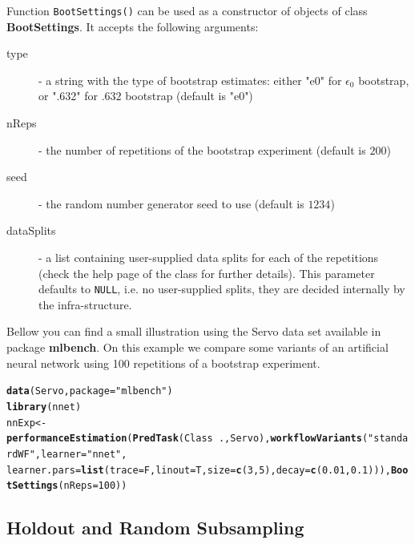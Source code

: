 \documentclass[10pt,a4paper]{article}\usepackage[]{graphicx}\usepackage[]{color}
\makeatletter
\newcommand{\hlnum}[1]{\textcolor[rgb]{0.686,0.059,0.569}{#1}}%
\newcommand{\hlstr}[1]{\textcolor[rgb]{0.192,0.494,0.8}{#1}}%
\newcommand{\hlopt}[1]{\textcolor[rgb]{0,0,0}{#1}}%
\newcommand{\hlstd}[1]{\textcolor[rgb]{0.345,0.345,0.345}{#1}}%
\newcommand{\hlkwb}[1]{\textcolor[rgb]{0.69,0.353,0.396}{#1}}%
\newcommand{\hlkwc}[1]{\textcolor[rgb]{0.333,0.667,0.333}{#1}}%
\newcommand{\hlkwd}[1]{\textcolor[rgb]{0.737,0.353,0.396}{\textbf{#1}}}%
\newenvironment{kframe}{%
 \def\at@end@of@kframe{}%
 \ifinner\ifhmode%
  \def\at@end@of@kframe{\end{minipage}}%
  \begin{minipage}{\columnwidth}%
 \fi\fi%
 \def\FrameCommand##1{\hskip\@totalleftmargin \hskip-\fboxsep
 \colorbox{shadecolor}{##1}\hskip-\fboxsep
     \hskip-\linewidth \hskip-\@totalleftmargin \hskip\columnwidth}%
 \MakeFramed {\advance\hsize-\width
   \@totalleftmargin\z@ \linewidth\hsize
   \@setminipage}}%
 {\par\unskip\endMakeFramed%
 \at@end@of@kframe}
\newenvironment{knitrout}{}{} %
\makeatother
\begin{document}
Function \texttt{BootSettings()} can be used as a constructor of
objects of class \textbf{BootSettings}. It accepts the following
arguments:

\begin{description}
\item[type] - a string with the type of bootstrap estimates: either "e0" for $\epsilon_0$ bootstrap, or ".632" for $.632$ bootstrap (default is "e0")
\item[nReps] - the number of repetitions of the bootstrap experiment (default is $200$)
\item[seed] - the random number generator seed to use (default is $1234$)
\item[dataSplits] - a list containing user-supplied data splits
  for each of the repetitions (check the help page of the
  class for further details). This parameter defaults to
  \texttt{NULL}, i.e. no user-supplied splits, they are decided
  internally by the infra-structure.
\end{description}

Bellow you can find a small illustration using the Servo data set available in package \textbf{mlbench}. On this example we compare some variants of an artificial neural network using 100 repetitions of a bootstrap experiment. 

\begin{knitrout}
\color{fgcolor}\begin{kframe}
\begin{alltt}
\hlkwd{data}\hlstd{(Servo,} \hlkwc{package} \hlstd{=} \hlstr{"mlbench"}\hlstd{)}
\hlkwd{library}\hlstd{(nnet)}
\hlstd{nnExp} \hlkwb{<-} \hlkwd{performanceEstimation}\hlstd{(}\hlkwd{PredTask}\hlstd{(Class} \hlopt{~} \hlstd{., Servo),} \hlkwd{workflowVariants}\hlstd{(}\hlstr{"standardWF"}\hlstd{,} \hlkwc{learner} \hlstd{=} \hlstr{"nnet"}\hlstd{,}
    \hlkwc{learner.pars} \hlstd{=} \hlkwd{list}\hlstd{(}\hlkwc{trace} \hlstd{= F,} \hlkwc{linout} \hlstd{= T,} \hlkwc{size} \hlstd{=} \hlkwd{c}\hlstd{(}\hlnum{3}\hlstd{,} \hlnum{5}\hlstd{),} \hlkwc{decay} \hlstd{=} \hlkwd{c}\hlstd{(}\hlnum{0.01}\hlstd{,} \hlnum{0.1}\hlstd{))),} \hlkwd{BootSettings}\hlstd{(}\hlkwc{nReps} \hlstd{=} \hlnum{100}\hlstd{))}
\end{alltt}
\end{kframe}
\end{knitrout}


\subsection{Holdout and Random Subsampling}
\end{document}
